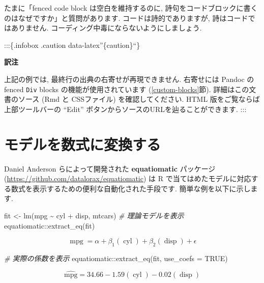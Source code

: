\documentclass[
  11pt,
  lualatex,ja=standard,jafont=noto]{bxjsreport}
\newenvironment{Shaded}{\begin{snugshade}}{\end{snugshade}}
\newcommand{\AttributeTok}[1]{\textcolor[rgb]{0.77,0.63,0.00}{#1}}
\newcommand{\CommentTok}[1]{\textcolor[rgb]{0.56,0.35,0.01}{\textit{#1}}}
\newcommand{\ConstantTok}[1]{\textcolor[rgb]{0.00,0.00,0.00}{#1}}
\newcommand{\FunctionTok}[1]{\textcolor[rgb]{0.00,0.00,0.00}{#1}}
\newcommand{\NormalTok}[1]{#1}
\newcommand{\OtherTok}[1]{\textcolor[rgb]{0.56,0.35,0.01}{#1}}
\newcommand{\SpecialCharTok}[1]{\textcolor[rgb]{0.00,0.00,0.00}{#1}}
\begin{document}
たまに「fenced code block は空白を維持するのに, 詩句をコードブロックに書くのはなぜですか」と質問があります. コードは詩的でありますが, 詩はコードではありません. コーディング中毒にならないようにしましょう.

:::\{.infobox .caution data-latex''\{caution\}``\}

\textbf{訳注}

上記の例では, 最終行の出典の右寄せが再現できません. 右寄せには Pandoc の fenced \texttt{Div} blocks の機能が使用されています (\ref{custom-blocks}節). 詳細はこの文書のソース (Rmd と CSSファイル) を確認してください. HTML 版をご覧ならば上部ツールバーの ``Edit'' ボタンからソースのURLを辿ることができます. :::

\hypertarget{equatiomatic}{%
\section{モデルを数式に変換する}\label{equatiomatic}}

Daniel Anderson らによって開発された \textbf{equatiomatic} パッケージ \autocite{R-equatiomatic} (\url{https://github.com/datalorax/equatiomatic}) は R で当てはめたモデルに対応する数式を表示するための便利な自動化された手段です. 簡単な例を以下に示します.

\begin{Shaded}
\begin{Highlighting}[numbers=left,,]
\NormalTok{fit }\OtherTok{\textless{}{-}} \FunctionTok{lm}\NormalTok{(mpg }\SpecialCharTok{\textasciitilde{}}\NormalTok{ cyl }\SpecialCharTok{+}\NormalTok{ disp, mtcars)}
\CommentTok{\# 理論モデルを表示}
\NormalTok{equatiomatic}\SpecialCharTok{::}\FunctionTok{extract\_eq}\NormalTok{(fit)}
\end{Highlighting}
\end{Shaded}

\[
\operatorname{mpg} = \alpha + \beta_{1}(\operatorname{cyl}) + \beta_{2}(\operatorname{disp}) + \epsilon
\]

\begin{Shaded}
\begin{Highlighting}[numbers=left,,]
\CommentTok{\# 実際の係数を表示}
\NormalTok{equatiomatic}\SpecialCharTok{::}\FunctionTok{extract\_eq}\NormalTok{(fit, }\AttributeTok{use\_coefs =} \ConstantTok{TRUE}\NormalTok{)}
\end{Highlighting}
\end{Shaded}

\[
\operatorname{\widehat{mpg}} = 34.66 - 1.59(\operatorname{cyl}) - 0.02(\operatorname{disp})
\]
\end{document}
